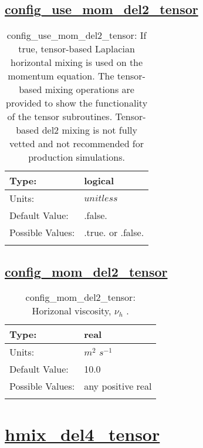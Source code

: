 \subsection[config\_use\_mom\_del2\_tensor]{\hyperref[sec:nm_tab_hmix_del2_tensor]{config\_use\_mom\_del2\_tensor}}
\label{subsec:nm_sec_config_use_mom_del2_tensor}
\begin{center}
\begin{longtable}{| p{2.0in} || p{4.0in} |}
    \hline
    Type: & logical \\
    \hline
    Units: & $unitless$ \\
    \hline
    Default Value: & .false. \\
    \hline
    Possible Values: & .true. or .false. \\
    \hline
    \caption{config\_use\_mom\_del2\_tensor: If true, tensor-based Laplacian horizontal mixing is used on the momentum equation. The tensor-based mixing operations are provided to show the functionality of the tensor subroutines. Tensor-based del2 mixing is not fully vetted and not recommended for production simulations.}
\end{longtable}
\end{center}
\subsection[config\_mom\_del2\_tensor]{\hyperref[sec:nm_tab_hmix_del2_tensor]{config\_mom\_del2\_tensor}}
\label{subsec:nm_sec_config_mom_del2_tensor}
\begin{center}
\begin{longtable}{| p{2.0in} || p{4.0in} |}
    \hline
    Type: & real \\
    \hline
    Units: & $m^2$ $s^{-1}$ \\
    \hline
    Default Value: & 10.0 \\
    \hline
    Possible Values: & any positive real \\
    \hline
    \caption{config\_mom\_del2\_tensor:  Horizonal viscosity,  $\nu_h$ .}
\end{longtable}
\end{center}
\section[hmix\_del4\_tensor]{\hyperref[sec:nm_tab_hmix_del4_tensor]{hmix\_del4\_tensor}}
\label{sec:nm_sec_hmix_del4_tensor}
